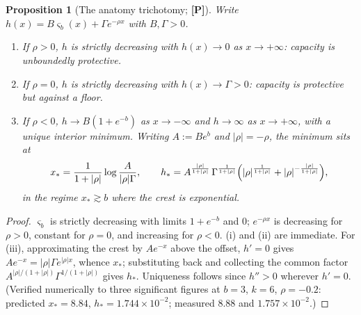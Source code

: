 \documentclass[11pt]{article}
\numberwithin{equation}{section}
\theoremstyle{plain}
\newtheorem{proposition}[theorem]{Proposition}
\theoremstyle{definition}
\theoremstyle{remark}
\begin{document}
\begin{proposition}[The anatomy trichotomy; \textbf{[P]}]
\label{gr1:prop:trichotomy}
Write $h(x)=B\varsigma_b(x)+\Gamma e^{-\rho x}$ with $B,\Gamma>0$.
\begin{enumerate}[label=\emph{(\roman*)},itemsep=1pt]
\item If $\rho>0$, $h$ is strictly decreasing with $h(x)\to0$ as
$x\to+\infty$: capacity is unboundedly protective.
\item If $\rho=0$, $h$ is strictly decreasing with
$h(x)\to\Gamma>0$: capacity is protective but against a floor.
\item If $\rho<0$, $h\to B(1+e^{-b})$ as $x\to-\infty$ and
$h\to\infty$ as $x\to+\infty$, with a unique interior minimum. Writing
$A:=Be^{b}$ and $|\rho|=-\rho$, the minimum sits at
\begin{equation}\label{gr1:eq:xstar}
x_\ast=\frac{1}{1+|\rho|}\log\frac{A}{|\rho|\Gamma},
\qquad
h_\ast=A^{\frac{|\rho|}{1+|\rho|}}\,\Gamma^{\frac{1}{1+|\rho|}}
\Bigl(|\rho|^{\frac{1}{1+|\rho|}}+|\rho|^{-\frac{|\rho|}{1+|\rho|}}\Bigr),
\end{equation}
in the regime $x_\ast\gtrsim b$ where the crest is exponential.
\end{enumerate}
\end{proposition}

\begin{proof}
$\varsigma_b$ is strictly decreasing with limits $1+e^{-b}$ and $0$;
$e^{-\rho x}$ is decreasing for $\rho>0$, constant for $\rho=0$, and
increasing for $\rho<0$. (i) and (ii) are immediate. For (iii),
approximating the crest by $Ae^{-x}$ above the offset, $h'=0$ gives
$Ae^{-x}=|\rho|\Gamma e^{|\rho|x}$, whence $x_\ast$; substituting back
and collecting the common factor
$A^{|\rho|/(1+|\rho|)}\Gamma^{1/(1+|\rho|)}$ gives $h_\ast$. Uniqueness
follows since $h''>0$ wherever $h'=0$. (Verified numerically to three
significant figures at $b=3$, $k=6$, $\rho=-0.2$: predicted
$x_\ast=8.84$, $h_\ast=1.744\times10^{-2}$; measured $8.88$ and
$1.757\times10^{-2}$.)
\end{proof}
\end{document}
